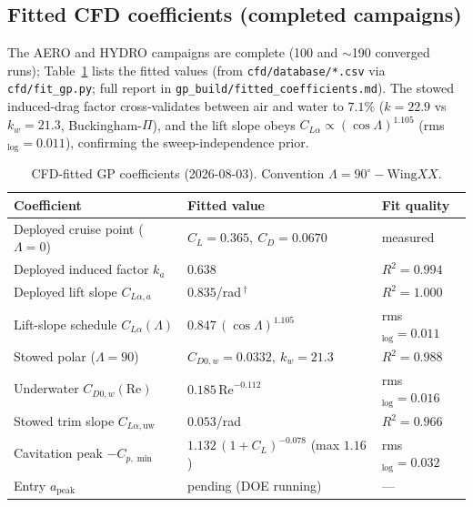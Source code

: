 \documentclass{new-aiaa}
\begin{document}
\subsection*{Fitted CFD coefficients (completed campaigns)}
The AERO and HYDRO campaigns are complete (100 and $\sim$190 converged runs); Table~\ref{tab:cfdfit}
lists the fitted values (from \texttt{cfd/database/*.csv} via \texttt{cfd/fit\_gp.py}; full report in
\texttt{gp\_build/fitted\_coefficients.md}). The stowed induced-drag factor cross-validates between
air and water to $7.1\%$ ($k=22.9$ vs $k_w=21.3$, Buckingham-$\Pi$), and the lift slope obeys
$C_{L\alpha}\propto(\cos\Lambda)^{1.105}$ (rms$_{\log}=0.011$), confirming the sweep-independence prior.
\begin{table}[h]\centering
\caption{CFD-fitted GP coefficients (2026-08-03). Convention $\Lambda=90^\circ-\text{Wing}XX$.}\label{tab:cfdfit}
\begin{tabular}{@{}lll@{}}\toprule
Coefficient & Fitted value & Fit quality \\\midrule
Deployed cruise point ($\Lambda{=}0$) & $C_L{=}0.365,\ C_D{=}0.0670$ & measured \\
Deployed induced factor $k_a$ & $0.638$ & $R^2{=}0.994$ \\
Deployed lift slope $C_{L\alpha,a}$ & $0.835$/rad\,$^\dagger$ & $R^2{=}1.000$ \\
Lift-slope schedule $C_{L\alpha}(\Lambda)$ & $0.847\,(\cos\Lambda)^{1.105}$ & rms$_{\log}{=}0.011$ \\
Stowed polar ($\Lambda{=}90$) & $C_{D0,w}{=}0.0332,\ k_w{=}21.3$ & $R^2{=}0.988$ \\
Underwater $C_{D0,w}(\mathrm{Re})$ & $0.185\,\mathrm{Re}^{-0.112}$ & rms$_{\log}{=}0.016$ \\
Stowed trim slope $C_{L\alpha,\text{uw}}$ & $0.053$/rad & $R^2{=}0.966$ \\
Cavitation peak $-C_{p,\min}$ & $1.132\,(1{+}C_L)^{-0.078}$ (max $1.16$) & rms$_{\log}{=}0.032$ \\
Entry $a_{\text{peak}}$ & pending (DOE running) & --- \\\bottomrule
\end{tabular}
\end{table}
\end{document}
